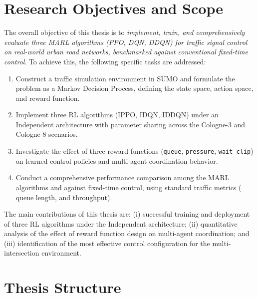 \section{Research Objectives and Scope}

The overall objective of this thesis is to \textit{implement, train, and
comprehensively evaluate three MARL algorithms (PPO, DQN, DDQN) for traffic signal
control on real-world urban road networks, benchmarked against conventional
fixed-time control}. To achieve this, the following specific tasks are addressed:

\begin{enumerate}
    \item Construct a traffic simulation environment in SUMO and formulate the
    problem as a Markov Decision Process, defining the state space, action
    space, and reward function.

    \item Implement three RL algorithms (IPPO, IDQN, IDDQN) under an Independent
    architecture with parameter sharing across the Cologne-3 and Cologne-8
    scenarios.

    \item Investigate the effect of three reward functions (\texttt{queue},
    \texttt{pressure}, \texttt{wait-clip}) on learned control policies and
    multi-agent coordination behavior.

    \item Conduct a comprehensive performance comparison among the MARL algorithms
    and against fixed-time control, using standard traffic metrics ( queue length, and throughput).
\end{enumerate}

The main contributions of this thesis are: (i) successful training and deployment
of three RL algorithms under the Independent architecture; (ii) quantitative
analysis of the effect of reward function design on multi-agent coordination;
and (iii) identification of the most
effective control configuration for the multi-intersection environment.

\section{Thesis Structure}

